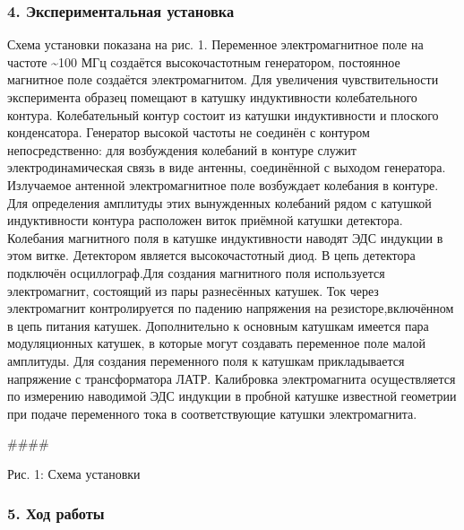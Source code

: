 \documentclass[11pt]{article}
\begin{document}
    \hypertarget{ux44dux43aux441ux43fux435ux440ux438ux43cux435ux43dux442ux430ux43bux44cux43dux430ux44f-ux443ux441ux442ux430ux43dux43eux432ux43aux430}{%
\subsubsection{4. Экспериментальная
установка}\label{ux44dux43aux441ux43fux435ux440ux438ux43cux435ux43dux442ux430ux43bux44cux43dux430ux44f-ux443ux441ux442ux430ux43dux43eux432ux43aux430}}

Схема установки показана на рис. 1. Переменное электромагнитное поле на
частоте \textasciitilde100 МГц создаётся высокочастотным генератором,
постоянное магнитное поле создаётся электромагнитом. Для увеличения
чувствительности эксперимента образец помещают в катушку индуктивности
колебательного контура. Колебательный контур состоит из катушки
индуктивности и плоского конденсатора. Генератор высокой частоты не
соединён с контуром непосредственно: для возбуждения колебаний в контуре
служит электродинамическая связь в виде антенны, соединённой с выходом
генератора. Излучаемое антенной электромагнитное поле возбуждает
колебания в контуре. Для определения амплитуды этих вынужденных
колебаний рядом с катушкой индуктивности контура расположен виток
приёмной катушки детектора. Колебания магнитного поля в катушке
индуктивности наводят ЭДС индукции в этом витке. Детектором является
высокочастотный диод. В цепь детектора подключён осциллограф.Для
создания магнитного поля используется электромагнит, состоящий из пары
разнесённых катушек. Ток через электромагнит контролируется по падению
напряжения на резисторе,включённом в цепь питания катушек. Дополнительно
к основным катушкам имеется пара модуляционных катушек, в которые могут
создавать переменное поле малой амплитуды. Для создания переменного поля
к катушкам прикладывается напряжение с трансформатора ЛАТР. Калибровка
электромагнита осуществляется по измерению наводимой ЭДС индукции в
пробной катушке известной геометрии при подаче переменного тока в
соответствующие катушки электромагнита.

\#\#\#\#

Рис. 1: Схема установки

    \hypertarget{ux445ux43eux434-ux440ux430ux431ux43eux442ux44b}{%
\subsubsection{5. Ход
работы}\label{ux445ux43eux434-ux440ux430ux431ux43eux442ux44b}}
\end{document}
